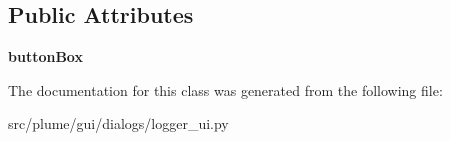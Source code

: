 \subsection*{Public Attributes}
\begin{DoxyCompactItemize}
\item 
{\bfseries button\+Box}\hypertarget{classlogger__ui_1_1_ui___dialog_ad0fc25587cda372992ef7eb9a80d68d8}{}\label{classlogger__ui_1_1_ui___dialog_ad0fc25587cda372992ef7eb9a80d68d8}

\end{DoxyCompactItemize}


The documentation for this class was generated from the following file\+:\begin{DoxyCompactItemize}
\item 
src/plume/gui/dialogs/logger\+\_\+ui.\+py\end{DoxyCompactItemize}
